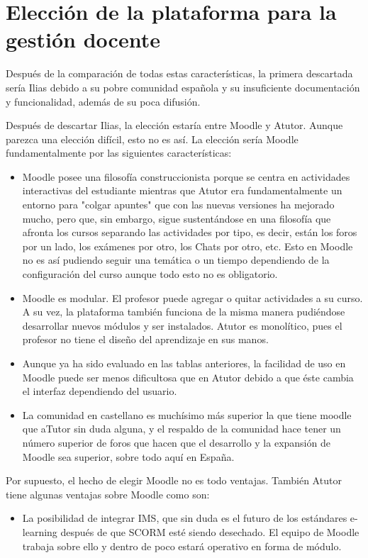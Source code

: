 \section{Elección de la plataforma para la gestión docente}

Después de la comparación de todas estas características, la primera descartada sería Ilias debido a su pobre comunidad española y su insuficiente documentación y funcionalidad, además de su poca difusión.

Después de descartar Ilias, la elección estaría entre Moodle y Atutor. Aunque parezca una elección difícil, esto no es así. La elección sería Moodle fundamentalmente por las siguientes características:

\begin{itemize}
	\item Moodle posee una filosofía construccionista porque se centra en actividades interactivas del estudiante mientras que Atutor era fundamentalmente un entorno para "colgar apuntes" que con las nuevas versiones ha mejorado mucho, pero que, sin embargo, sigue sustentándose en una filosofía que afronta los cursos separando las actividades por tipo, es decir, están los foros por un lado, los exámenes por otro, los Chats por otro, etc. Esto en Moodle no es así pudiendo seguir una temática o un tiempo dependiendo de la configuración del curso aunque todo esto no es obligatorio.
	\item Moodle es modular. El profesor puede agregar o quitar actividades a su curso. A su vez, la plataforma también funciona de la misma manera pudiéndose desarrollar nuevos módulos y ser instalados. Atutor es monolítico, pues el profesor no tiene el diseño del aprendizaje en sus manos.
	\item Aunque ya ha sido evaluado en las tablas anteriores, la facilidad de uso en Moodle puede ser menos dificultosa que en Atutor debido a que éste cambia el interfaz dependiendo del usuario.
	\item La comunidad en castellano es muchísimo más superior la que tiene moodle que aTutor sin duda alguna, y el respaldo de la comunidad hace tener un número superior de foros que hacen que el desarrollo y la expansión de Moodle sea superior, sobre todo aquí en España.
\end{itemize}

Por supuesto, el hecho de elegir Moodle no es todo ventajas. También Atutor tiene algunas ventajas sobre Moodle como son:

\begin{itemize}
	\item La posibilidad de integrar IMS, que sin duda es el futuro de los estándares e-learning después de que SCORM esté siendo desechado. El equipo de Moodle trabaja sobre ello y dentro de poco estará operativo en forma de módulo.
\end{itemize}
